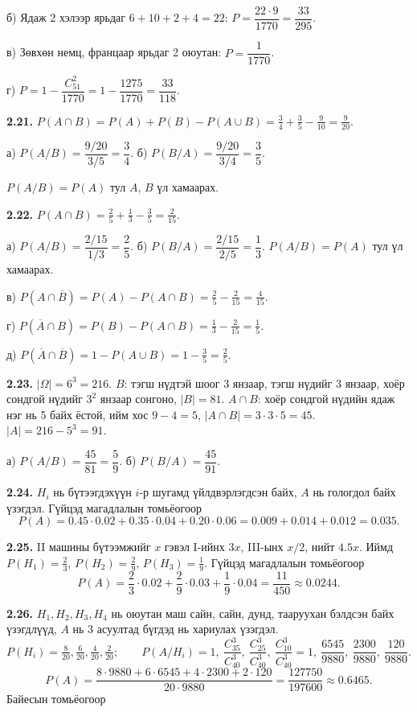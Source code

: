 \documentclass[11pt,a4paper]{article}
\newcommand{\bod}[1]{\par\medskip\noindent\textbf{#1}\quad}
\newcommand{\ol}[1]{\overline{#1}}
\begin{document}
б) Ядаж 2 хэлээр ярьдаг $6+10+2+4=22$: $P=\dfrac{22\cdot9}{1770}=\dfrac{33}{295}$.

в) Зөвхөн немц, францаар ярьдаг 2 оюутан: $P=\dfrac{1}{1770}$.

г) $P=1-\dfrac{C_{51}^2}{1770}=1-\dfrac{1275}{1770}=\dfrac{33}{118}$.

\bod{2.21.}
$P(A\cap B)=P(A)+P(B)-P(A\cup B)=\frac34+\frac35-\frac9{10}=\frac{9}{20}$.

а) $P(A/B)=\dfrac{9/20}{3/5}=\dfrac34$. \quad б) $P(B/A)=\dfrac{9/20}{3/4}=\dfrac35$.

$P(A/B)=P(A)$ тул $A$, $B$ үл хамаарах.

\bod{2.22.}
$P(A\cap B)=\frac25+\frac13-\frac35=\frac{2}{15}$.

а) $P(A/B)=\dfrac{2/15}{1/3}=\dfrac25$. \quad б) $P(B/A)=\dfrac{2/15}{2/5}=\dfrac13$. $P(A/B)=P(A)$ тул үл хамаарах.

в) $P(A\cap\ol{B})=P(A)-P(A\cap B)=\frac25-\frac2{15}=\frac4{15}$.

г) $P(\ol{A}\cap B)=P(B)-P(A\cap B)=\frac13-\frac2{15}=\frac15$.

д) $P(\ol{A}\cap\ol{B})=1-P(A\cup B)=1-\frac35=\frac25$.

\bod{2.23.}
$|\Omega|=6^3=216$. $B$: тэгш нүдтэй шоог 3 янзаар, тэгш нүдийг 3 янзаар, хоёр сондгой нүдийг $3^2$ янзаар сонгоно, $|B|=81$.
$A\cap B$: хоёр сондгой нүдийн ядаж нэг нь 5 байх ёстой, ийм хос $9-4=5$, $|A\cap B|=3\cdot3\cdot5=45$. $|A|=216-5^3=91$.

а) $P(A/B)=\dfrac{45}{81}=\dfrac59$. \quad б) $P(B/A)=\dfrac{45}{91}$.

\bod{2.24.}
$H_i$ нь бүтээгдэхүүн $i$-р шугамд үйлдвэрлэгдсэн байх, $A$ нь гологдол байх үзэгдэл. Гүйцэд магадлалын томьёогоор
\[
P(A)=0.45\cdot0.02+0.35\cdot0.04+0.20\cdot0.06=0.009+0.014+0.012=0.035 .
\]

\bod{2.25.}
II машины бүтээмжийг $x$ гэвэл I-ийнх $3x$, III-ынх $x/2$, нийт $4.5x$. Иймд $P(H_1)=\frac23$, $P(H_2)=\frac29$, $P(H_3)=\frac19$. Гүйцэд магадлалын томьёогоор
\[
P(A)=\frac23\cdot0.02+\frac29\cdot0.03+\frac19\cdot0.04=\frac{11}{450}\approx0.0244 .
\]

\bod{2.26.}
$H_1,H_2,H_3,H_4$ нь оюутан маш сайн, сайн, дунд, тааруухан бэлдсэн байх үзэгдлүүд, $A$ нь 3 асуултад бүгдэд нь хариулах үзэгдэл.
\[
P(H_i)=\tfrac{8}{20},\tfrac{6}{20},\tfrac{4}{20},\tfrac{2}{20};\qquad
P(A/H_i)=1,\ \frac{C_{35}^3}{C_{40}^3},\ \frac{C_{25}^3}{C_{40}^3},\ \frac{C_{10}^3}{C_{40}^3}
=1,\ \frac{6545}{9880},\ \frac{2300}{9880},\ \frac{120}{9880}.
\]
\[
P(A)=\frac{8\cdot9880+6\cdot6545+4\cdot2300+2\cdot120}{20\cdot9880}=\frac{127750}{197600}\approx0.6465 .
\]
Байесын томьёогоор
\end{document}
